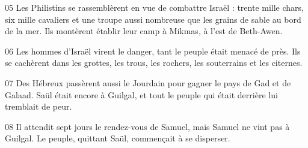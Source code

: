 
05 Les Philistins se rassemblèrent en vue de combattre Israël : trente mille chars, six mille cavaliers et une troupe aussi nombreuse que les grains de sable au bord de la mer. Ils montèrent établir leur camp à Mikmas, à l’est de Beth-Awen.

06 Les hommes d’Israël virent le danger, tant le peuple était menacé de près. Ils se cachèrent dans les grottes, les trous, les rochers, les souterrains et les citernes.

07 Des Hébreux passèrent aussi le Jourdain pour gagner le pays de Gad et de Galaad. Saül était encore à Guilgal, et tout le peuple qui était derrière lui tremblait de peur.

08 Il attendit sept jours le rendez-vous de Samuel, mais Samuel ne vint pas à Guilgal. Le peuple, quittant Saül, commençait à se disperser.

